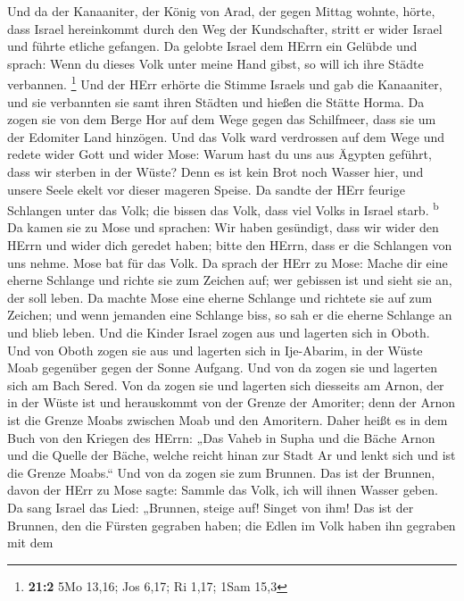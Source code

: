  Und da der Kanaaniter, der König von Arad, der gegen
Mittag wohnte, hörte, dass Israel hereinkommt durch den Weg der
Kundschafter, stritt er wider Israel und führte etliche gefangen.
 Da gelobte Israel dem HErrn ein Gelübde und sprach: Wenn
du dieses Volk unter meine Hand gibst, so will ich ihre Städte
verbannen. \footnote{\textbf{21:2} 5Mo 13,16; Jos 6,17; Ri 1,17; 1Sam
  15,3}  Und der HErr erhörte die Stimme Israels und gab
die Kanaaniter, und sie verbannten sie samt ihren Städten und hießen die
Stätte Horma.  Da zogen sie von dem Berge Hor auf dem Wege
gegen das Schilfmeer, dass sie um der Edomiter Land hinzögen. Und das
Volk ward verdrossen auf dem Wege  und redete wider Gott
und wider Mose: Warum hast du uns aus Ägypten geführt, dass wir sterben
in der Wüste? Denn es ist kein Brot noch Wasser hier, und unsere Seele
ekelt vor dieser mageren Speise.  Da sandte der HErr
feurige Schlangen unter das Volk; die bissen das Volk, dass viel Volks
in Israel starb. \textsuperscript{b}  Da kamen sie zu Mose
und sprachen: Wir haben gesündigt, dass wir wider den HErrn und wider
dich geredet haben; bitte den HErrn, dass er die Schlangen von uns
nehme. Mose bat für das Volk.  Da sprach der HErr zu Mose:
Mache dir eine eherne Schlange und richte sie zum Zeichen auf; wer
gebissen ist und sieht sie an, der soll leben.  Da machte
Mose eine eherne Schlange und richtete sie auf zum Zeichen; und wenn
jemanden eine Schlange biss, so sah er die eherne Schlange an und blieb
leben.  Und die Kinder Israel zogen aus und lagerten sich
in Oboth.  Und von Oboth zogen sie aus und lagerten sich
in Ije-Abarim, in der Wüste Moab gegenüber gegen der Sonne Aufgang.
 Und von da zogen sie und lagerten sich am Bach Sered.
 Von da zogen sie und lagerten sich diesseits am Arnon,
der in der Wüste ist und herauskommt von der Grenze der Amoriter; denn
der Arnon ist die Grenze Moabs zwischen Moab und den Amoritern.
 Daher heißt es in dem Buch von den Kriegen des HErrn:
„Das Vaheb in Supha und die Bäche Arnon  und die Quelle
der Bäche, welche reicht hinan zur Stadt Ar und lenkt sich und ist die
Grenze Moabs.``  Und von da zogen sie zum Brunnen. Das
ist der Brunnen, davon der HErr zu Mose sagte: Sammle das Volk, ich will
ihnen Wasser geben.  Da sang Israel das Lied: „Brunnen,
steige auf! Singet von ihm!  Das ist der Brunnen, den die
Fürsten gegraben haben; die Edlen im Volk haben ihn gegraben mit dem
